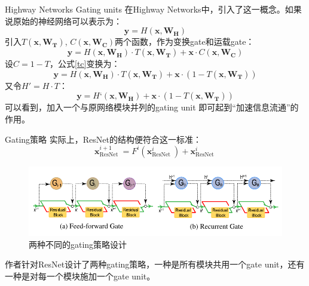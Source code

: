 \documentclass[UTF8, fontset=founder, aspectratio=43, 10pt, t]{ctexbeamer}
\begin{document}
\begin{frame}{Highway Networks}
	\alert{Gating units} 在Highway Networks中，引入了这一概念。如果说原始的神经网络可以表示为：
	\begin{equation}
	\mathbf{y}=H\left(\mathbf{x}, \mathbf{W}_{\mathbf{H}}\right)
	\end{equation}
	引入$T\left(\mathbf{x}, \mathbf{W}_{\mathbf{T}}\right)$, $C\left(\mathbf{x}, \mathbf{W}_{\mathbf{C}}\right)$两个函数，作为变换gate和运载gate：
	\begin{equation}
	\label{tc}
	\mathbf{y}=H\left(\mathbf{x}, \mathbf{W}_{\mathbf{H}}\right) \cdot T\left(\mathbf{x}, \mathbf{W}_{\mathbf{T}}\right)+\mathbf{x} \cdot C\left(\mathbf{x}, \mathbf{W}_{\mathbf{C}}\right)
	\end{equation}
	设$C=1-T$，公式\eqref{tc}变换为：
	\begin{equation}
	\mathbf{y}=H\left(\mathbf{x}, \mathbf{W}_{\mathbf{H}}\right) \cdot T\left(\mathbf{x}, \mathbf{W}_{\mathbf{T}}\right)+\mathbf{x} \cdot\left(1-T\left(\mathbf{x}, \mathbf{W}_{\mathbf{T}}\right)\right)
	\end{equation}
	又令$H'=H\cdot T$：
	\begin{equation}
	\mathbf{y}=H‘\left(\mathbf{x}, \mathbf{W}_{\mathbf{H}}\right)+\mathbf{x} \cdot\left(1-T\left(\mathbf{x}, \mathbf{W}_{\mathbf{T}}\right)\right)
	\end{equation}
	可以看到，加入一个与原网络模块并列的gating unit 即可起到“加速信息流通”的作用。
	
\end{frame}

\begin{frame}{Gating策略}
	实际上，ResNet的结构便符合这一标准：
	\begin{equation}
	\mathbf{x}_{\text {ResNet }}^{i+1}=F^{i}\left(\mathbf{x}_{\text {ResNet }}^{i}\right)+\mathbf{x}_{\text {ResNet }}^{i}
	\end{equation}
	\begin{figure}
		\centering
		\includegraphics[width=0.7\linewidth]{Images/gatingdesign}
		\caption{两种不同的gating策略设计}
		\label{fig:gatingdesign}
	\end{figure}
	作者针对ResNet设计了两种gating策略，一种是所有模块共用一个gate unit，还有一种是对每一个模块施加一个gate unit。
	
\end{frame}
\end{document}
